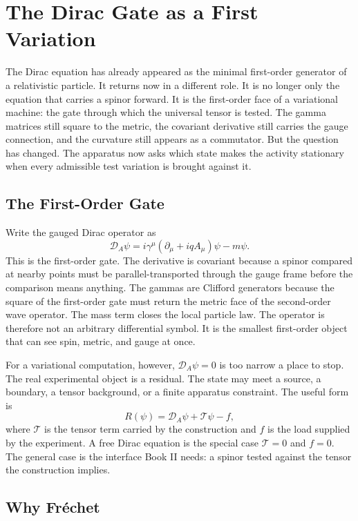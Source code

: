 \chapter{The Dirac Gate as a First Variation}
\label{chap:dirac-gate-first-variation}

The Dirac equation has already appeared as the minimal first-order generator of a relativistic particle. It
returns now in a different role. It is no longer only the equation that carries a spinor forward. It is the
first-order face of a variational machine: the gate through which the universal tensor is tested. The gamma
matrices still square to the metric, the covariant derivative still carries the gauge connection, and the
curvature still appears as a commutator. But the question has changed. The apparatus now asks which state makes
the activity stationary when every admissible test variation is brought against it.

\section{The First-Order Gate}

Write the gauged Dirac operator as
\[
  \mathcal D_A \psi =
  i\gamma^\mu(\partial_\mu + iqA_\mu)\psi - m\psi .
\]
This is the first-order gate. The derivative is covariant because a spinor compared at nearby points must be
parallel-transported through the gauge frame before the comparison means anything. The gammas are Clifford
generators because the square of the first-order gate must return the metric face of the second-order wave
operator. The mass term closes the local particle law. The operator is therefore not an arbitrary differential
symbol. It is the smallest first-order object that can see spin, metric, and gauge at once.

For a variational computation, however, \(\mathcal D_A\psi=0\) is too narrow a place to stop. The real
experimental object is a residual. The state may meet a source, a boundary, a tensor background, or a finite
apparatus constraint. The useful form is
\[
  R(\psi) = \mathcal D_A\psi + \mathcal T\psi - f,
\]
where \(\mathcal T\) is the tensor term carried by the construction and \(f\) is the load supplied by the
experiment. A free Dirac equation is the special case \(\mathcal T=0\) and \(f=0\). The general case is the
interface Book II needs: a spinor tested against the tensor the construction implies.

\section{Why Fréchet}

